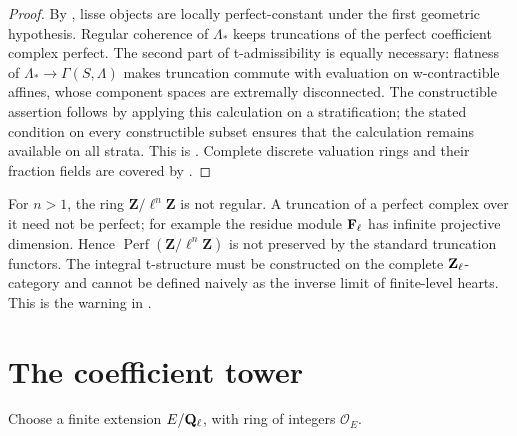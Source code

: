 \begin{proof}
By \cite[Theorem~4.13]{HRSConstructible}, lisse objects are locally
perfect-constant under the first geometric hypothesis.  Regular coherence of
\(\Lambda_*\) keeps truncations of the perfect coefficient complex perfect.
The second part of t-admissibility is equally necessary: flatness of
\(\Lambda_*\to\Gamma(S,\Lambda)\) makes truncation commute with evaluation on
w-contractible affines, whose component spaces are extremally disconnected.
The constructible assertion follows by applying this calculation on a
stratification; the stated condition on every constructible subset ensures
that the calculation remains available on all strata.  This is
\cite[Theorem~6.2]{HRSConstructible}.  Complete discrete valuation rings and
their fraction fields are covered by
\cite[Lemma~6.10 and Corollary~6.11]{HRSConstructible}.
\end{proof}

\begin{warning}
For \(n>1\), the ring \(\mathbf Z/\ell^n\mathbf Z\) is not regular.  A truncation of a
perfect complex over it need not be perfect; for example the residue module
\(\mathbf F_\ell\) has infinite projective dimension.  Hence
\(\operatorname{Perf}(\mathbf Z/\ell^n\mathbf Z)\) is not preserved by the standard truncation functors.
The integral t-structure must be constructed on the complete
\(\mathbf Z_\ell\)-category and cannot be defined naively as the inverse limit of
finite-level hearts.  This is the warning in
\cite[Section~6]{HRSConstructible}.
\end{warning}

\section{The coefficient tower}

Choose a finite extension \(E/\mathbf Q_\ell\), with ring of integers \(\mathcal O_E\).


